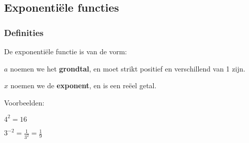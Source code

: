 

\subsection{Exponenti\"ele functies}

\subsubsection{Definities}

De exponenti\"ele functie is van de vorm:

\noindent \vspace{0.2cm}


\vspace{0.5cm}


\noindent $a$ noemen we het \textbf{grondtal}, en moet strikt positief
en verschillend van 1 zijn.

\noindent $x$ noemen we de \textbf{exponent}, en is een re\"eel getal.

\medskip{}


Voorbeelden: 

${\displaystyle 4^{2}=16}$

${\displaystyle 3^{-2}=\frac{1}{3^{2}}=\frac{1}{9}}$

